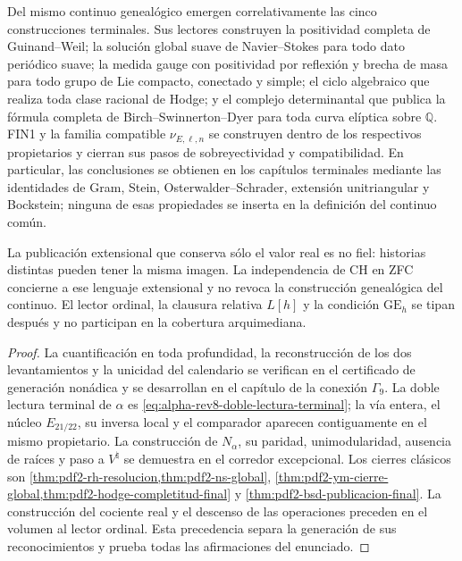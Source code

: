 \begin{theorem}
Del mismo continuo genealógico emergen correlativamente las cinco
construcciones terminales. Sus lectores construyen la positividad completa
de Guinand--Weil; la solución global suave de Navier--Stokes para todo dato
periódico suave; la medida gauge con positividad por reflexión y brecha de
masa para todo grupo de Lie compacto, conectado y simple; el ciclo algebraico
que realiza toda clase racional de Hodge; y el complejo determinantal que
publica la fórmula completa de Birch--Swinnerton--Dyer para toda curva
elíptica sobre \(\mathbb Q\). FIN1 y la familia compatible
\(\nu_{E,\ell,n}\) se construyen dentro de los respectivos propietarios y
cierran sus pasos de sobreyectividad y compatibilidad. En particular, las conclusiones se obtienen en los capítulos
terminales mediante las identidades
de Gram, Stein, Osterwalder--Schrader, extensión unitriangular y Bockstein;
ninguna de esas propiedades se inserta en la definición del continuo común.

La publicación extensional que conserva sólo el valor real es no fiel:
historias distintas pueden tener la misma imagen. La independencia de CH en
ZFC concierne a ese lenguaje extensional y no revoca la construcción
genealógica del continuo. El lector ordinal, la clausura relativa \(L[h]\)
y la condición \(\mathrm{GE}_h\) se tipan después y no participan en la
cobertura arquimediana.
\end{theorem}

\begin{proof}
La cuantificación en toda profundidad, la reconstrucción de los dos
levantamientos y la unicidad del calendario se verifican en el certificado
de generación nonádica y se desarrollan en el capítulo de la conexión
\(\Gamma_9\). La doble lectura terminal de \(\alpha\) es
\eqref{eq:alpha-rev8-doble-lectura-terminal}; la vía entera, el núcleo
\(E_{21/22}\), su inversa local y el comparador aparecen contiguamente en
el mismo propietario. La construcción de \(N_\alpha\), su paridad,
unimodularidad, ausencia de raíces y paso a \(V^\natural\) se demuestra en
el corredor excepcional. Los cierres clásicos son
\cref{thm:pdf2-rh-resolucion,thm:pdf2-ns-global},
\cref{thm:pdf2-ym-cierre-global,thm:pdf2-hodge-completitud-final} y
\cref{thm:pdf2-bsd-publicacion-final}. La construcción del cociente real y el
descenso de las operaciones preceden en el volumen al lector ordinal. Esta
precedencia separa la generación de sus reconocimientos y prueba todas las
afirmaciones del enunciado.
\end{proof}

